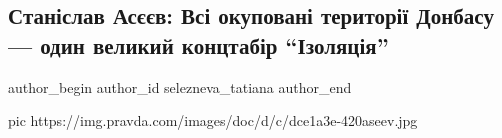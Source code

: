  
 
 
 
 
 
\subsection{Станіслав Асєєв: Всі окуповані території Донбасу — один великий концтабір \enquote{Ізоляція}}
\label{sec:29_12_2020.news.ua.pravda.selezneva_tatiana.1.stanislav_aseev}
\ifcmt
	author_begin
   author_id selezneva_tatiana
	author_end
\fi

\ifcmt
  pic https://img.pravda.com/images/doc/d/c/dce1a3e-420aseev.jpg
\fi

